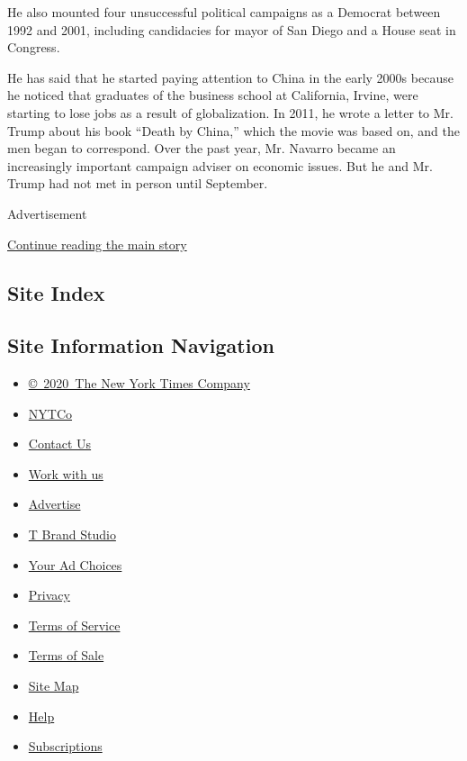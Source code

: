 He also mounted four unsuccessful political campaigns as a Democrat
between 1992 and 2001, including candidacies for mayor of San Diego and
a House seat in Congress.

He has said that he started paying attention to China in the early 2000s
because he noticed that graduates of the business school at California,
Irvine, were starting to lose jobs as a result of globalization. In
2011, he wrote a letter to Mr. Trump about his book ``Death by China,''
which the movie was based on, and the men began to correspond. Over the
past year, Mr. Navarro became an increasingly important campaign adviser
on economic issues. But he and Mr. Trump had not met in person until
September.

Advertisement

\protect\hyperlink{after-bottom}{Continue reading the main story}

\hypertarget{site-index}{%
\subsection{Site Index}\label{site-index}}

\hypertarget{site-information-navigation}{%
\subsection{Site Information
Navigation}\label{site-information-navigation}}

\begin{itemize}
\tightlist
\item
  \href{https://help.nytimes.com/hc/en-us/articles/115014792127-Copyright-notice}{©~2020~The
  New York Times Company}
\end{itemize}

\begin{itemize}
\tightlist
\item
  \href{https://www.nytco.com/}{NYTCo}
\item
  \href{https://help.nytimes.com/hc/en-us/articles/115015385887-Contact-Us}{Contact
  Us}
\item
  \href{https://www.nytco.com/careers/}{Work with us}
\item
  \href{https://nytmediakit.com/}{Advertise}
\item
  \href{http://www.tbrandstudio.com/}{T Brand Studio}
\item
  \href{https://www.nytimes.com/privacy/cookie-policy\#how-do-i-manage-trackers}{Your
  Ad Choices}
\item
  \href{https://www.nytimes.com/privacy}{Privacy}
\item
  \href{https://help.nytimes.com/hc/en-us/articles/115014893428-Terms-of-service}{Terms
  of Service}
\item
  \href{https://help.nytimes.com/hc/en-us/articles/115014893968-Terms-of-sale}{Terms
  of Sale}
\item
  \href{https://spiderbites.nytimes.com}{Site Map}
\item
  \href{https://help.nytimes.com/hc/en-us}{Help}
\item
  \href{https://www.nytimes.com/subscription?campaignId=37WXW}{Subscriptions}
\end{itemize}
